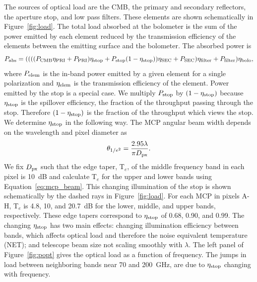 \documentclass[]{spie}  %
\begin{document}
The sources of optical load are the CMB, the primary and secondary reflectors, the aperture stop, and low pass filters.  
These elements are shown schematically in Figure~\ref{fig:load}. 
The total load absorbed at the bolometer is the sum of the power emitted by each element reduced by the transmission 
efficiency of the elements between the emitting surface and the bolometer.  
The absorbed power is
\begin{equation}
\label{eq:load}
P_{\rm abs} =  (((( P_{\rm CMB} \eta_{\rm PRI} + P_{\rm PRI} ) \eta_{\rm stop} + P_{\rm stop}(1-\eta_{\rm stop}) ) \eta_{\rm SEC} + P_{\rm SEC})\eta_{\rm filter} + P_{\rm filter}) \eta_{\rm bolo},
\end{equation} 
where $P_{\rm elem}$ is the in-band power emitted by a given element for a single polarization and $\eta_{\rm elem}$ is the 
transmission efficiency 
of the element. Power emitted by the stop is a special case. We multiply $P_{\rm stop}$ by 
$(1-\eta_{\rm stop})$ because $\eta_{\rm stop}$ is the spillover efficiency, the fraction of the throughput passing through the 
stop. Therefore $(1-\eta_{\rm stop})$ is the fraction of the throughput which views the stop. We determine 
$\eta_{\rm stop}$ in the following way. 
The MCP angular beam width depends on the wavelength and pixel diameter as\cite{suzuki2013_thesis}
\begin{equation}
\label{eq:mcp_beam}
\theta_{1/e^2} = \frac{2.95 \lambda}{\pi D_{\rm px}}. 
\end{equation} 
We fix $D_{\rm px}$ such that 
the edge taper, T$_e$, of the middle frequency band in each pixel is 10~dB and calculate T$_e$ for the upper and lower bands 
using Equation~\ref{eq:mcp_beam}. This changing illumination of the stop is shown schematically by 
the dashed rays in Figure~\ref{fig:load}. 
For each MCP in pixels A-H, T$_e$ is 4.8, 10, and 20.7~dB for the lower, middle, and upper bands, respectively.  These 
edge tapers correspond to $\eta_{\rm stop}$ of 0.68, 0.90, and 0.99.
The changing $\eta_{\rm stop}$ has two main effects: changing illumination efficiency between bands, which affects optical load 
and therefore the noise equivalent temperature (NET); and telescope beam size not scaling 
smoothly with $\lambda$.
The left panel of Figure~\ref{fig:popt} gives the optical load as a function of frequency. The jumps in load between 
neighboring bands near 70 and 200~GHz, are 
due to $\eta_{\rm stop}$ changing with frequency. 
\end{document}
